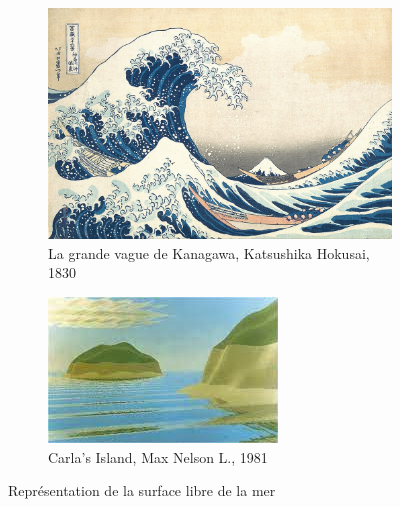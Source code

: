 				\begin{figure}[!htb]
					\centering
					\begin{subfigure}[t]{0.48\textwidth}
						\includegraphics[width=\textwidth]{imgs/tsunami_hokusai.jpg}
						\caption{La grande vague de Kanagawa, Katsushika Hokusai, 1830~\cite{hokusai_1830}}
						\label{fig:hokusai}
					\end{subfigure}
					\begin{subfigure}[t]{0.5\textwidth}
						\includegraphics[width=\textwidth]{imgs/carlas_island.png}
						\caption{Carla's Island, Max Nelson L., 1981~\cite{max81}}
						\label{fig:carlas_island}
					\end{subfigure}
					\caption{Représentation de la surface libre de la mer}
					\label{fig:representation_mer}
				\end{figure}

